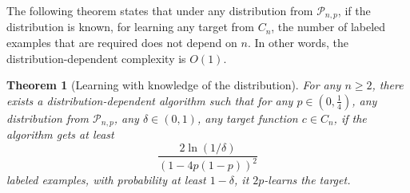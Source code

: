 \documentclass[10pt]{article}
\newtheorem{theorem}[proposition]{Theorem}
\renewcommand{\P}{\mathcal{P}}
\begin{document}
The following theorem states that under any distribution from $\P_{n,p}$, if the
distribution is known, for learning any target from $C_n$, the number of
labeled examples that are required does not depend on $n$. In other
words, the distribution-dependent complexity is $O(1)$.

\begin{theorem}[Learning with knowledge of the distribution]
For any $n \ge 2$, there exists a distribution-dependent algorithm such that
for any $p \in (0,\frac{1}{4})$, any distribution from $\P_{n,p}$, any $\delta
\in (0,1)$, any target function $c \in C_n$,
if the algorithm gets at least
$$
\frac{2\ln(1/\delta)}{(1 - 4p(1-p))^2}
$$
labeled examples, with probability at least $1 - \delta$, it $2p$-learns the target.
\end{theorem}
\end{document}
